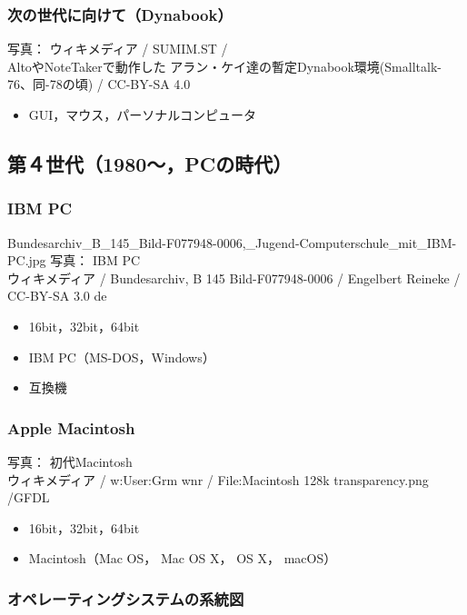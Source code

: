 \documentclass[unicode]{beamer}                   %
\begin{document}
\begin{frame}
  \frametitle{次の世代に向けて（Dynabook）}
        {\tiny 写真： ウィキメディア /  SUMIM.ST / \\
          AltoやNoteTakerで動作した
          アラン・ケイ達の暫定Dynabook環境(Smalltalk-76、同-78の頃) /
          CC-BY-SA 4.0}
  \begin{itemize}
    \item GUI，マウス，パーソナルコンピュータ
  \end{itemize}
\end{frame}

\subsection{第４世代（1980〜，PCの時代）}
\begin{frame}
  \frametitle{IBM PC}
{Bundesarchiv_B_145_Bild-F077948-0006,_Jugend-Computerschule_mit_IBM-PC.jpg}
      {\tiny
          写真： IBM PC \\
          ウィキメディア /
          Bundesarchiv, B 145 Bild-F077948-0006 /
          Engelbert Reineke / CC-BY-SA 3.0 de
      }
  \begin{itemize}
    \item 16bit，32bit，64bit
    \item IBM PC（MS-DOS，Windows）
    \item 互換機
  \end{itemize}
\end{frame}

\begin{frame}
  \frametitle{Apple Macintosh}
      {\tiny
          写真： 初代Macintosh \\
          ウィキメディア / w:User:Grm wnr / 
          File:Macintosh 128k transparency.png /GFDL
      }
  \begin{itemize}
    \item 16bit，32bit，64bit
    \item Macintosh（Mac OS， Mac OS X， OS X， macOS）
  \end{itemize}
\end{frame}

\begin{frame}
  \frametitle{オペレーティングシステムの系統図}
\end{frame}
\end{document}
